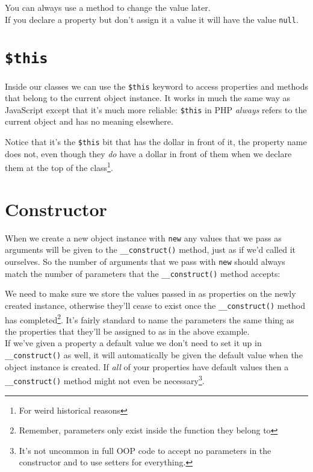 
You can always use a method to change the value later.
\\

If you declare a property but don't assign it a value it will have the value \texttt{null}.


\section{\texttt{\$this}}

Inside our classes we can use the \texttt{\$this} keyword to access properties and methods that belong to the current object instance. It works in much the same way as JavaScript except that it's much more reliable: \texttt{\$this} in PHP \textit{always} refers to the current object and has no meaning elsewhere.


Notice that it's the \texttt{\$this} bit that has the dollar in front of it, the property name does not, even though they \textit{do} have a dollar in front of them when we declare them at the top of the class\footnote{For weird historical reasons}.

\section{Constructor}

When we create a new object instance with \texttt{new} any values that we pass as arguments will be given to the \texttt{\_\_construct()} method, just as if we'd called it ourselves. So the number of arguments that we pass with \texttt{new} should always match the number of parameters that the \texttt{\_\_construct()} method accepts:


We need to make sure we store the values passed in as properties on the newly created instance, otherwise they'll cease to exist once the \texttt{\_\_construct()} method has completed\footnote{Remember, parameters only exist inside the function they belong to}. It's fairly standard to name the parameters the same thing as the properties that they'll be assigned to as in the above example.
\\

If we've given a property a default value we don't need to set it up in \texttt{\_\_construct()} as well, it will automatically be given the default value when the object instance is created. If \textit{all} of your properties have default values then a \texttt{\_\_construct()} method might not even be necessary\footnote{It's not uncommon in full OOP code to accept no parameters in the constructor and to use setters for everything.}.

